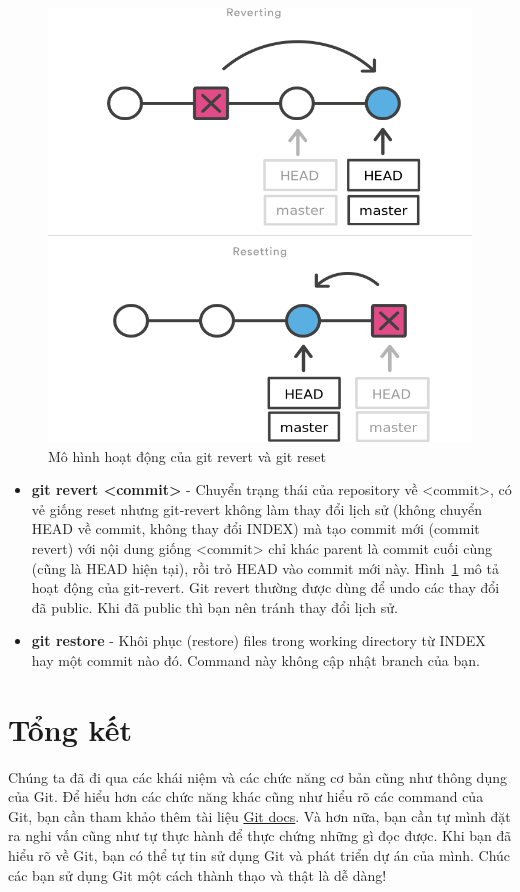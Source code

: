 \documentclass[a4paper, 11pt]{article}
\begin{document}
\begin{figure}
\centering
\includegraphics[scale=0.4]{git-revert-vs-reset.png}
\caption{Mô hình hoạt động của git revert và git reset}
\label{fig:git-revert}
\end{figure}

\begin{itemize}
\item \textbf{git revert <commit>} - Chuyển trạng thái của repository về <commit>, có vẻ giống reset nhưng git-revert không làm thay đổi lịch sử (không chuyển HEAD về commit, không thay đổi INDEX) mà tạo commit mới (commit revert) với nội dung giống <commit> chỉ khác parent là commit cuối cùng (cũng là HEAD hiện tại), rồi trỏ HEAD vào commit mới này. Hình~\ref{fig:git-revert} mô tả hoạt động của git-revert. Git revert thường được dùng để undo các thay đổi đã public. Khi đã public thì bạn nên tránh thay đổi lịch sử.
\item \textbf{git restore} - Khôi phục (restore) files trong working directory từ INDEX hay một commit nào đó. Command này không cập nhật branch của bạn. 
\end{itemize}

\section{Tổng kết}
Chúng ta đã đi qua các khái niệm và các chức năng cơ bản cũng như thông dụng của Git. Để hiểu hơn các chức năng khác cũng như hiểu rõ các command của Git, bạn cần tham khảo thêm tài liệu \href{https://git-scm.com/docs}{Git docs}. Và hơn nữa, bạn cần tự mình đặt ra nghi vấn cũng như tự thực hành để thực chứng những gì đọc được. Khi bạn đã hiểu rõ về Git, bạn có thể tự tin sử dụng Git và phát triển dự án của mình. Chúc các bạn sử dụng Git một cách thành thạo và thật là dễ dàng!
\end{document}
